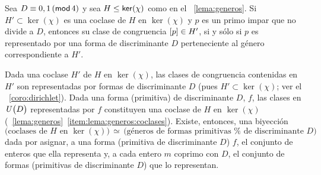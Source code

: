 \begin{teoGenerosB}\label{teo:generos}
	Sea $D\equiv 0,1\tmodulo[4]$ y sea $H\subgrpeq\ker(\chi)$
	como en el \lemaname~\ref{lema:generos}. Si $H'\subset\ker(\chi)$
	es una coclase de $H$ en $\ker(\chi)$ y $p$ es un primo impar
	que no divide a $D$, entonces su clase de congruencia
	$\clase p\in H'$, si y s\'olo si $p$ es representado por una forma
	de discriminante $D$ perteneciente al g\'enero correspondiente a $H'$.
\end{teoGenerosB}

\begin{obsGenerosB}\label{obs:generos:correspondencia}
	Dada una coclase $H'$ de $H$ en $\ker(\chi)$, las clases de
	congruencia contenidas en $H'$ son representadas por formas
	de discriminante $D$ (pues $H'\subset\ker(\chi)$; ver el
	\coroname~\ref{coro:dirichlet}).
	Dada una forma (primitiva) de discriminante $D$, $f$,
	las clases en $\Unidadesmod[D]$ representadas por $f$
	constituyen una coclase de $H$ en $\ker(\chi)$
	(\lemaname~\ref{lema:generos}~\eqref{item:lema:generos:coclases}).
	Existe, entonces, una biyecci\'on
	\begin{displaymath}
		\big(
			\text{coclases de }
			H\text{ en }\ker(\chi)
		\big)\,\simeq\,
		\big(
			\text{g\'eneros de formas primitivas %
				de discriminante } D
		\big)
	\end{displaymath}
	dada por asignar, a una forma (primitiva de discriminante $D$) $f$,
	el conjunto de enteros que ella representa
	y, a cada entero $m$ coprimo con $D$, el conjunto de formas
	(primitivas de discriminante $D$) que lo representan.
\end{obsGenerosB}

